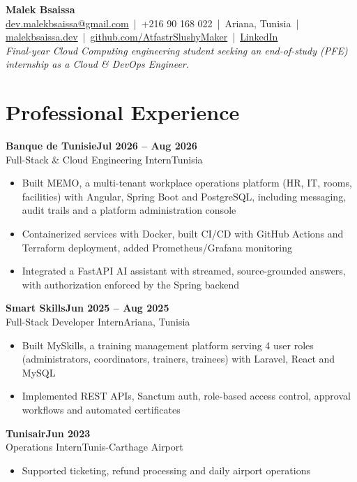 \documentclass[10pt]{article}
\newcommand{\entry}[4]{%
  \textbf{#1}\hfill\textbf{#2}\\
  #3\hfill #4\vspace{-1pt}}
\newcommand{\gap}{\vspace{3pt}}
\begin{document}
{\fontsize{26}{28}\selectfont\bfseries Malek Bsaissa}\\[3pt]
\href{mailto:dev.malekbsaissa@gmail.com}{dev.malekbsaissa@gmail.com} \,|\, +216 90 168 022 \,|\, Ariana, Tunisia \,|\,
\href{https://malekbsaissa.dev}{malekbsaissa.dev} \,|\,
\href{https://github.com/AtfastrSlushyMaker}{github.com/AtfastrSlushyMaker} \,|\,
\href{https://www.linkedin.com/in/malek-bsaissa-8861b229b/}{LinkedIn}\\[2pt]
\textit{Final-year Cloud Computing engineering student seeking an end-of-study (PFE) internship as a Cloud \& DevOps Engineer.}

\section{Professional Experience}

\entry{Banque de Tunisie}{Jul 2026 -- Aug 2026}{Full-Stack \& Cloud Engineering Intern}{Tunisia}
\begin{itemize}
  \item Built MEMO, a multi-tenant workplace operations platform (HR, IT, rooms, facilities) with Angular, Spring Boot and PostgreSQL, including messaging, audit trails and a platform administration console
  \item Containerized services with Docker, built CI/CD with GitHub Actions and Terraform deployment, added Prometheus/Grafana monitoring
  \item Integrated a FastAPI AI assistant with streamed, source-grounded answers, with authorization enforced by the Spring backend
\end{itemize}
\gap

\entry{Smart Skills}{Jun 2025 -- Aug 2025}{Full-Stack Developer Intern}{Ariana, Tunisia}
\begin{itemize}
  \item Built MySkills, a training management platform serving 4 user roles (administrators, coordinators, trainers, trainees) with Laravel, React and MySQL
  \item Implemented REST APIs, Sanctum auth, role-based access control, approval workflows and automated certificates
\end{itemize}
\gap

\entry{Tunisair}{Jun 2023}{Operations Intern}{Tunis-Carthage Airport}
\begin{itemize}
  \item Supported ticketing, refund processing and daily airport operations
\end{itemize}
\end{document}
